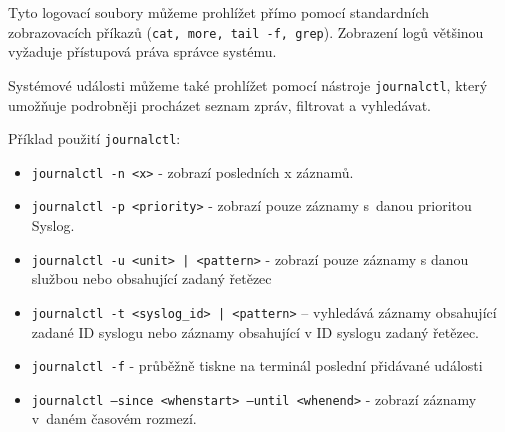 Tyto logovací soubory můžeme prohlížet přímo pomocí standardních zobrazovacích příkazů ({\tt cat, more, tail -f, grep}). Zobrazení logů většinou vyžaduje přístupová práva správce systému. 

Systémové události můžeme také prohlížet pomocí nástroje \texttt{journalctl}, který umožňuje podrobněji procházet seznam zpráv, filtrovat a vyhledávat.

Příklad použití \texttt{journalctl}:
\begin{itemize}
  \item \texttt{journalctl -n <x>} - zobrazí posledních x záznamů.
  \item \texttt{journalctl -p <priority>} - zobrazí pouze záznamy s~danou prioritou Syslog.
  \item \texttt{journalctl -u <unit> | <pattern>} - zobrazí pouze záznamy s danou službou nebo obsahující zadaný řetězec
  \item \texttt{journalctl -t <syslog\_id> | <pattern>} -- vyhledává záznamy obsahující zadané ID syslogu nebo záznamy obsahující v ID syslogu zadaný řetězec.
  \item \texttt{journalctl -f} - průběžně tiskne na terminál poslední přidávané události
  \item \texttt{journalctl --since <whenstart> --until <whenend>} - zobrazí záznamy v~daném časovém rozmezí.
\end{itemize}





